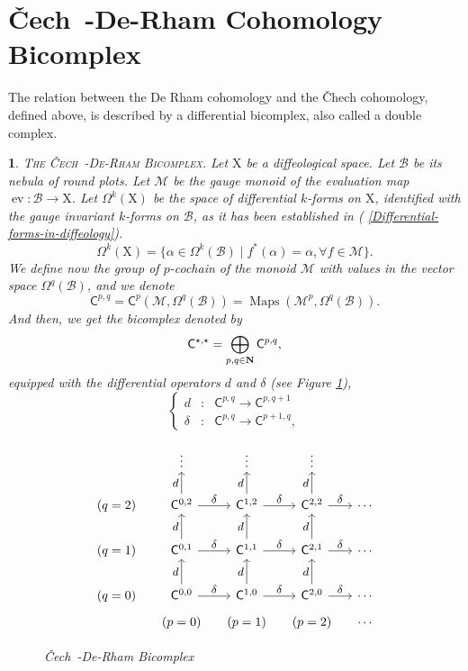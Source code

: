 \documentclass[12pt,reqno]{amsart}
\theoremstyle{article}
\newtheorem{article}{}
\def\artlabel[#1]{\textsc{#1}.}
\newcommand{\art}[1]{(\text{\textsection} \ref{#1})}
\def \X{\mathrm X}
\newcommand{\NN}{{\bf N}}
\newcommand{\cB}{{\mathcal B}}
\newcommand{\cM}{\mathcal{M}}
\newcommand{\sC}{\mathsf{C}}
\newcommand{\Cech}{\v{C}ech\ }
\DeclareMathOperator{\ev}{ev}
\DeclareMathOperator{\Maps}{Maps}
\begin{document}
  \section{\Cech-De-Rham Cohomology Bicomplex}
  
  The relation between the De Rham cohomology and the \v{C}hech cohomology,
  defined above,
  is described by a differential bicomplex,
  also called a double complex.
  
  \begin{article}\artlabel[The \Cech-De-Rham Bicomplex]
    Let $\X$ be a diffeological space.
    Let $\cB$ be its nebula of round plots.
    Let $\cM$ be the gauge monoid of the evaluation map $\ev \colon \cB \to \X$.
    Let $\Omega^k(\X)$ be the space of differential $k$-forms on $\X$,
    identified with the gauge invariant $k$-forms on $\cB$,
    as it has been established in \art{Differential-forms-in-diffeology}.
    $$
    \Omega^k(\X) = \{ \alpha \in \Omega^k(\cB) \mid f^*(\alpha) = \alpha, \forall f \in \cM \}.
    $$
    We define now the group of $p$-cochain of the monoid $\cM$ with values in the vector space $\Omega^q(\cB)$,
    and we denote
    $$
    \sC^{p,q} = \sC^p(\cM,\Omega^q(\cB)) = \Maps(\cM^p,\Omega^q(\cB)).
    $$
    And then,
    we get the bicomplex denoted by
    $$
    \sC^{\star,\star} = \bigoplus_{p,q \in \NN} \sC^{p,q},
    $$
    equipped with the differential operators $d$ and $\delta$ (see Figure \ref{bicomplex-CDR}),
    $$
    \left\{
    \begin{array}{lcl}
      d   & : & \sC^{p,q}\rightarrow \sC^{p,q+1}\\
      \delta  & : & \sC^{p,q}\rightarrow \sC^{p+1,q},
    \end{array}
    \right.
    $$
    
    \begin{figure}[th]
      $$
      \begin{tikzcd}[column sep=small,every label/.append style = {font = \small}]
        & \vdots                                            & \vdots                                          &   \vdots                                        &         \\
        (q=2) & \sC^{0,2} \arrow[u, "d"] \arrow[r, "\delta"] & \sC^{1,2} \arrow[u, "d"] \arrow[r,"\delta"] & \sC^{2,2} \arrow[u, "d"] \arrow[r,"\delta"] & \cdots  \\
        (q=1) & \sC^{0,1} \arrow[u, "d"] \arrow[r, "\delta"]  & \sC^{1,1} \arrow[u, "d"] \arrow[r,"\delta"] & \sC^{2,1} \arrow[u, "d"] \arrow[r,"\delta"] & \cdots  \\
        (q=0) & \sC^{0,0} \arrow[u, "d"] \arrow[r, "\delta"]  & \sC^{1,0} \arrow[u, "d"] \arrow[r,"\delta"] & \sC^{2,0} \arrow[u, "d"] \arrow[r,"\delta"] & \cdots  \\[-.5cm]
        & (p=0)                                             & (p=1)                                           & (p=2)                                           & \cdots
      \end{tikzcd}
      $$
      \vspace{-.5cm}
      \caption{\Cech-De-Rham Bicomplex}
      \label{bicomplex-CDR}
    \end{figure}
    

\end{article}
\end{document}
